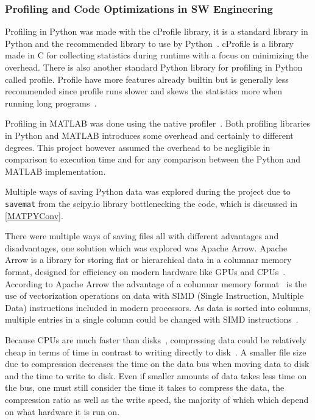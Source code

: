\documentclass[12pt, a4paper]{article}
\begin{document}
\subsubsection{Profiling and Code Optimizations in SW Engineering}
Profiling in Python was made with the cProfile library,
it is a standard library in Python and the recommended library to use by Python~\cite{Py:cProfile}.
cProfile is a library made in C for collecting statistics during runtime with a focus on minimizing the overhead.
There is also another standard Python library for profiling in Python called profile.
Profile have more features already builtin but is generally less recommended since profile runs slower and skews the statistics more when running long programs~\cite{Py:cProfile}.

Profiling in MATLAB was done using the native profiler~\cite{matProfile}.
Both profiling libraries in Python and MATLAB introduces some overhead and certainly to different degrees.
This project however assumed the overhead to be negligible in comparison to execution time and for any comparison between the Python and MATLAB implementation.%


Multiple ways of saving Python data was explored during the project due to \texttt{savemat} from the scipy.io library bottlenecking the code, which is discussed in \ref{MATPYConv}.


There were multiple ways of saving files all with different advantages and disadvantages, one solution which was explored was Apache Arrow.
Apache Arrow is a library for storing flat or hierarchical data in a columnar memory format, designed for efficiency on modern hardware like GPUs and CPUs~\cite{AA:apacheArrow}.
According to Apache Arrow the advantage of a columnar memory format~\cite{enwiki:columnarData} is the use of vectorization operations on data with SIMD (Single Instruction, Multiple Data) instructions included in modern processors.
As data is sorted into columns, multiple entries in a single column could be changed with SIMD instructions~\cite{AA:Overview}.


Because CPUs are much faster than disks~\cite{DiskSlow}, compressing data could be relatively cheap in terms of time in contrast to writing directly to disk~\cite{1607248}.
A smaller file size due to compression decreases the time on the data bus when moving data to disk and the time to write to disk.
Even if smaller amounts of data takes less time on the bus, one must still consider the time it takes to compress the data, the compression ratio as well as the write speed, the majority of which which depend on what hardware it is run on.
\end{document}

